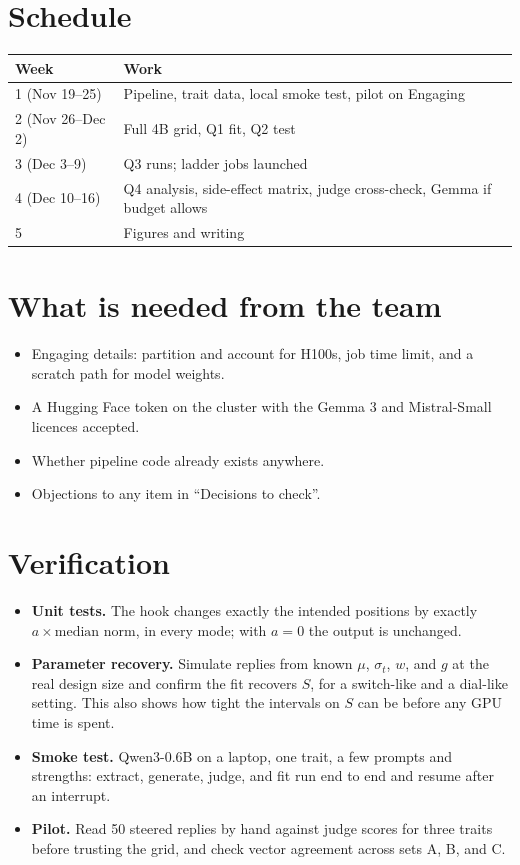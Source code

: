 \documentclass[11pt]{article}
\begin{document}
\section{Schedule}

\begin{center}
\begin{tabular}{@{}ll@{}}
\toprule
Week & Work \\
\midrule
1 (Nov 19--25) & Pipeline, trait data, local smoke test, pilot on Engaging \\
2 (Nov 26--Dec 2) & Full 4B grid, Q1 fit, Q2 test \\
3 (Dec 3--9) & Q3 runs; ladder jobs launched \\
4 (Dec 10--16) & Q4 analysis, side-effect matrix, judge cross-check, Gemma if budget allows \\
5 & Figures and writing \\
\bottomrule
\end{tabular}
\end{center}

\section{What is needed from the team}

\begin{itemize}
  \item Engaging details: partition and account for H100s, job time limit, and
        a scratch path for model weights.
  \item A Hugging Face token on the cluster with the Gemma 3 and Mistral-Small
        licences accepted.
  \item Whether pipeline code already exists anywhere.
  \item Objections to any item in ``Decisions to check''.
\end{itemize}

\section{Verification}

\begin{itemize}
  \item \textbf{Unit tests.} The hook changes exactly the intended positions by
        exactly $a \times \text{median norm}$, in every mode; with $a = 0$ the
        output is unchanged.
  \item \textbf{Parameter recovery.} Simulate replies from known $\mu$,
        $\sigma_t$, $w$, and $g$ at the real design size and confirm the fit
        recovers $S$, for a switch-like and a dial-like setting. This also
        shows how tight the intervals on $S$ can be before any GPU time is
        spent.
  \item \textbf{Smoke test.} Qwen3-0.6B on a laptop, one trait, a few prompts
        and strengths: extract, generate, judge, and fit run end to end and
        resume after an interrupt.
  \item \textbf{Pilot.} Read 50 steered replies by hand against judge scores
        for three traits before trusting the grid, and check vector agreement
        across sets A, B, and C.
\end{itemize}
\end{document}
